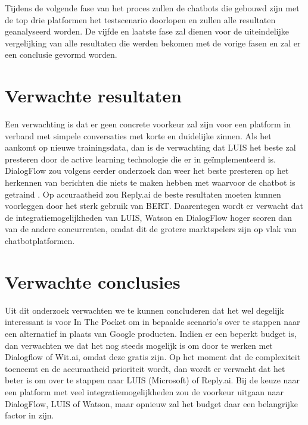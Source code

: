 \bigskip
Tijdens de volgende fase van het proces zullen de chatbots die gebouwd zijn met de top drie platformen het testscenario doorlopen en zullen alle resultaten geanalyseerd worden.
De vijfde en laatste fase zal dienen voor de uiteindelijke vergelijking van alle resultaten die werden bekomen met de vorige fasen en zal er een conclusie gevormd worden.


\section{Verwachte resultaten}
\label{sec:verwachte_resultaten} 

Een verwachting is dat er geen concrete voorkeur zal zijn voor een platform in verband met simpele conversaties met korte en duidelijke zinnen. Als het aankomt op nieuwe trainingsdata, dan is de verwachting dat LUIS het beste zal presteren door de active learning technologie die er in geïmplementeerd is. DialogFlow zou volgens eerder onderzoek dan weer het beste presteren op het herkennen van berichten die niets te maken hebben met waarvoor de chatbot is getraind \autocite{Russis2018}. Op accuraatheid zou Reply.ai de beste resultaten moeten kunnen voorleggen door het sterk gebruik van BERT. Daarentegen wordt er verwacht dat de integratiemogelijkheden van LUIS, Watson en DialogFlow hoger scoren dan van de andere concurrenten, omdat dit de grotere marktspelers zijn op vlak van chatbotplatformen.

\section{Verwachte conclusies}
\label{sec:verwachte_conclusies}

Uit dit onderzoek verwachten we te kunnen concluderen dat het wel degelijk interessant is voor In The Pocket om in bepaalde scenario’s over te stappen naar een alternatief in plaats van Google producten. Indien er een beperkt budget is, dan verwachten we dat het nog steeds mogelijk is om door te werken met Dialogflow of Wit.ai, omdat deze gratis zijn. Op het moment dat de complexiteit toeneemt en de accuraatheid prioriteit wordt, dan wordt er verwacht dat het beter is om over te stappen naar LUIS (Microsoft) of Reply.ai. Bij de keuze naar een platform met veel integratiemogelijkheden zou de voorkeur uitgaan naar DialogFlow, LUIS of Watson, maar opnieuw zal het budget daar een belangrijke factor in zijn.

